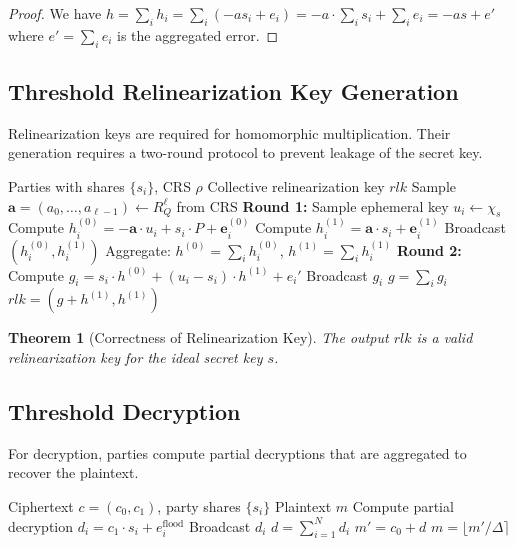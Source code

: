 \documentclass[11pt,a4paper]{article}
\newtheorem{theorem}{Theorem}[section]
\begin{document}
\begin{proof}
We have $h = \sum_i h_i = \sum_i (-as_i + e_i) = -a \cdot \sum_i s_i + \sum_i e_i = -as + e'$ where $e' = \sum_i e_i$ is the aggregated error.
\end{proof}

\subsection{Threshold Relinearization Key Generation}

Relinearization keys are required for homomorphic multiplication. Their generation requires a two-round protocol to prevent leakage of the secret key.

\begin{algorithm}
\caption{Collective Relinearization Key Generation}
\begin{algorithmic}[1]
\Require Parties with shares $\{s_i\}$, CRS $\rho$
\Ensure Collective relinearization key $rlk$
\State Sample $\mathbf{a} = (a_0, \ldots, a_{\ell-1}) \leftarrow R_Q^\ell$ from CRS
\State \textbf{Round 1:}
    \State Sample ephemeral key $u_i \leftarrow \chi_s$
    \State Compute $h_i^{(0)} = -\mathbf{a} \cdot u_i + s_i \cdot P + \mathbf{e}_i^{(0)}$
    \State Compute $h_i^{(1)} = \mathbf{a} \cdot s_i + \mathbf{e}_i^{(1)}$
    \State Broadcast $(h_i^{(0)}, h_i^{(1)})$
\EndFor
\State Aggregate: $h^{(0)} = \sum_i h_i^{(0)}$, $h^{(1)} = \sum_i h_i^{(1)}$
\State \textbf{Round 2:}
    \State Compute $g_i = s_i \cdot h^{(0)} + (u_i - s_i) \cdot h^{(1)} + e_i'$
    \State Broadcast $g_i$
\EndFor
\State $g = \sum_i g_i$
\State $rlk = (g + h^{(1)}, h^{(1)})$
\end{algorithmic}
\end{algorithm}

\begin{theorem}[Correctness of Relinearization Key]
The output $rlk$ is a valid relinearization key for the ideal secret key $s$.
\end{theorem}

\subsection{Threshold Decryption}

For decryption, parties compute partial decryptions that are aggregated to recover the plaintext.

\begin{algorithm}
\caption{Threshold Decryption}
\begin{algorithmic}[1]
\Require Ciphertext $c = (c_0, c_1)$, party shares $\{s_i\}$
\Ensure Plaintext $m$
    \State Compute partial decryption $d_i = c_1 \cdot s_i + e_i^{\text{flood}}$
    \State Broadcast $d_i$
\EndFor
\State $d = \sum_{i=1}^{N} d_i$
\State $m' = c_0 + d$
\State $m = \lfloor m' / \Delta \rceil$
\end{algorithmic}
\end{algorithm}
\end{document}
